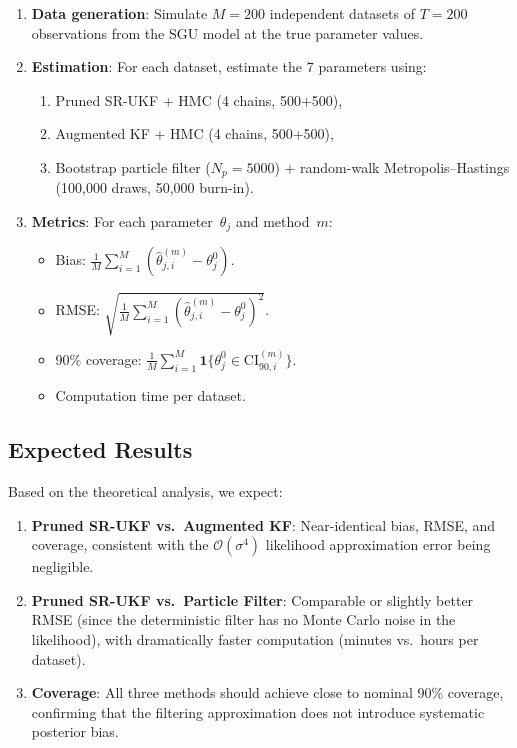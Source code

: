\documentclass[12pt,a4paper]{article}
\newcommand{\cO}{\mathcal{O}}
\begin{document}
\begin{enumerate}[nosep]
\item \textbf{Data generation}: Simulate $M = 200$ independent
datasets of $T = 200$ observations from the SGU model at the true
parameter values.
\item \textbf{Estimation}: For each dataset, estimate the 7
parameters using:
\begin{enumerate}[nosep,label=(\alph*)]
\item Pruned SR-UKF + HMC (4 chains, 500+500),
\item Augmented KF + HMC (4 chains, 500+500),
\item Bootstrap particle filter ($N_p = 5000$) + random-walk
Metropolis--Hastings (100,000 draws, 50,000 burn-in).
\end{enumerate}
\item \textbf{Metrics}: For each parameter~$\theta_j$ and method~$m$:
\begin{itemize}[nosep]
\item Bias: $\frac{1}{M}\sum_{i=1}^M (\hat{\theta}_{j,i}^{(m)} - \theta_j^0)$.
\item RMSE:
$\sqrt{\frac{1}{M}\sum_{i=1}^M (\hat{\theta}_{j,i}^{(m)} - \theta_j^0)^2}$.
\item 90\% coverage:
$\frac{1}{M}\sum_{i=1}^M \mathbf{1}\{\theta_j^0 \in \mathrm{CI}_{90,i}^{(m)}\}$.
\item Computation time per dataset.
\end{itemize}
\end{enumerate}

\subsection{Expected Results}

Based on the theoretical analysis, we expect:

\begin{enumerate}[nosep]
\item \textbf{Pruned SR-UKF vs.\ Augmented KF}: Near-identical bias,
RMSE, and coverage, consistent with the $\cO(\sigma^4)$ likelihood
approximation error being negligible.
\item \textbf{Pruned SR-UKF vs.\ Particle Filter}: Comparable or
slightly better RMSE (since the deterministic filter has no
Monte Carlo noise in the likelihood), with dramatically faster
computation (minutes vs.\ hours per dataset).
\item \textbf{Coverage}: All three methods should achieve close to
nominal 90\% coverage, confirming that the filtering approximation
does not introduce systematic posterior bias.
\end{enumerate}
\end{document}
